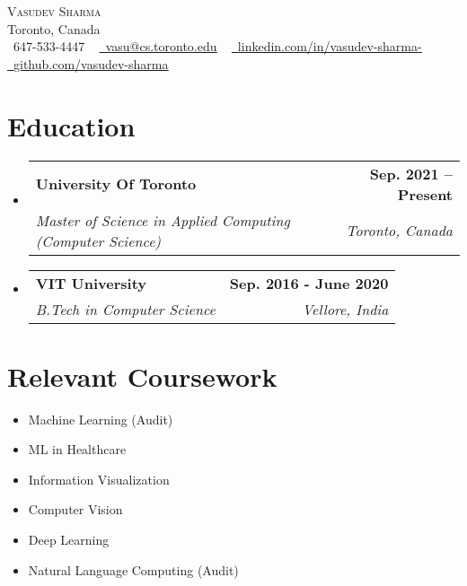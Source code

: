 \documentclass[letterpaper,11pt]{article}
\makeatletter
\newcommand{\resumeSubheading}[4]{
  \vspace{-2pt}\item
    \begin{tabular*}{1.0\textwidth}[t]{l@{\extracolsep{\fill}}r}
      \textbf{#1} & \textbf{\small #2} \\
      \textit{\small#3} & \textit{\small #4} \\
    \end{tabular*}\vspace{-7pt}
}
\newcommand{\resumeSubHeadingListStart}{\begin{itemize}[leftmargin=0.0in, label={}]}
\newcommand{\resumeSubHeadingListEnd}{\end{itemize}}
\makeatother
\begin{document}
\begin{center}
    {\Huge \scshape Vasudev Sharma} \\ \vspace{1pt}
    Toronto, Canada \\ \vspace{1pt}
    \small \raisebox{-0.1\height}\faPhone\ 647-533-4447 ~ \href{mailto:vasu@cs.toronto.edu}{\raisebox{-0.2\height}\faEnvelope\  \underline{vasu@cs.toronto.edu}} ~ 
    \href{https://linkedin.com/in//}{\raisebox{-0.2\height}\faLinkedin\ \underline{linkedin.com/in/vasudev-sharma-}}  ~
    \href{https://github.com/}{\raisebox{-0.2\height}\faGithub\ \underline{github.com/vasudev-sharma}}
    \vspace{-8pt}
\end{center}

\begin{comment}
    \section{Summary}
    An open source contributor with one 1-year experience as a Machine Learning Engineer
\end{comment}
\section{Education}
  \resumeSubHeadingListStart
    \resumeSubheading
      {University Of Toronto}{Sep. 2021 -- Present}
      {Master of Science in Applied Computing (Computer Science)}{Toronto, Canada}
    \resumeSubheading
        {VIT University}{Sep. 2016 - June 2020}
        {B.Tech in Computer Science}{Vellore, India}
  \resumeSubHeadingListEnd

\section{Relevant Coursework}
        \begin{multicols}{4}
            \begin{itemize}[itemsep=-10pt, parsep=15pt]
                \item\small Machine Learning (Audit)
                \item\small ML in Healthcare
                \item Information Visualization
                \item Computer Vision 
                \item Deep Learning
                \item \small Natural Language Computing (Audit)
            \end{itemize}
        \end{multicols}
        \vspace*{1.0\multicolsep}
\end{document}
